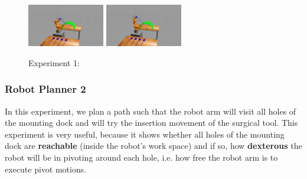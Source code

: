 \begin{center}
\begin{figure}[H]
\includegraphics[width=0.3\textwidth]{images/robot_planner1/robot_planner1_8}
\includegraphics[width=0.3\textwidth]{images/robot_planner1/robot_planner1_9}\\
\caption{Experiment 1:}
\end{figure}
\end{center}


\subsubsection{Robot Planner 2}

In this experiment, we plan a path such that the robot arm will visit all holes of the mounting dock and will try the insertion movement of the surgical tool.
This experiment is very useful, because it shows whether all holes of the mounting dock are \textbf{reachable} (inside the robot's work space) and if so, how 
\textbf{dexterous} the robot will be in pivoting around each hole, i.e. how free the robot arm is to execute pivot motions.

